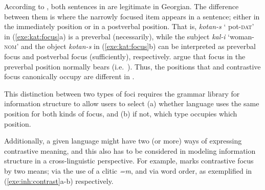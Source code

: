 

\noindent According to \citeauthor{skopeteas:fanselow:10}, both
sentences in  are legitimate in Georgian. The
difference between them is where the narrowly focused item appears in
a sentence; either in the immediately  position or in a
postverbal position. That is, \textit{kotan-s} ` pot-\textsc{dat}' in
(\ref{exe:kat:focus}a) is a preverbal  (necessarily), while the
subject \textit{kal-i} `woman-\textsc{nom}' and the object
\textit{kotan-s} in (\ref{exe:kat:focus}b) can be interpreted as
preverbal focus and postverbal focus (sufficiently), respectively.
\citeauthor{skopeteas:fanselow:10} argue that focus in the preverbal
position normally bears  (i.e.\ ).
Thus, the positions that  and contrastive
focus canonically occupy are different in .

This distinction between two types of foci requires the grammar
library for information structure to allow users to select (a) whether
language uses the same position for both kinds of focus, and (b) if
not, which type occupies which position.


Additionally, a given language might have two (or more) ways of
expressing contrastive meaning, and this also has to be considered in
modeling information structure in a cross-linguistic perspective.  For
example,  marks contrastive focus by two means; via the
use of a clitic \textit{=m}, and via word order, as exemplified in
(\ref{exe:inh:contrast}a-b) respectively.






